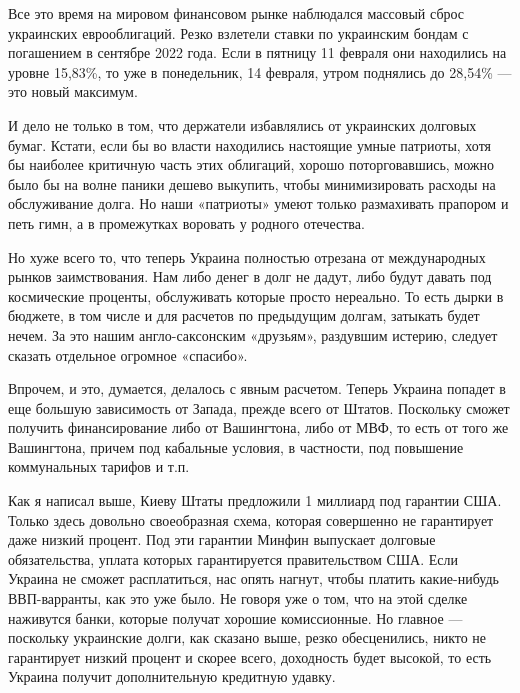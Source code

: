 Все это время на мировом финансовом рынке наблюдался массовый сброс украинских
еврооблигаций. Резко взлетели ставки по украинским бондам с погашением в
сентябре 2022 года. Если в пятницу 11 февраля они находились на уровне 15,83\%,
то уже в понедельник, 14 февраля, утром поднялись до 28,54\% — это новый
максимум.

И дело не только в том, что держатели избавлялись от украинских долговых бумаг.
Кстати, если бы во власти находились настоящие умные патриоты, хотя бы наиболее
критичную часть этих облигаций, хорошо поторговавшись, можно было бы на волне
паники дешево выкупить, чтобы минимизировать расходы на обслуживание долга. Но
наши «патриоты» умеют только размахивать прапором и петь гимн, а в промежутках
воровать у родного отечества.

Но хуже всего то, что теперь Украина полностью отрезана от международных рынков
заимствования. Нам либо денег в долг не дадут, либо будут давать под
космические проценты, обслуживать которые просто нереально. То есть дырки в
бюджете, в том числе и для расчетов по предыдущим долгам, затыкать будет нечем.
За это нашим англо-саксонским «друзьям», раздувшим истерию, следует сказать
отдельное огромное «спасибо».

Впрочем, и это, думается, делалось с явным расчетом. Теперь Украина попадет в
еще большую зависимость от Запада, прежде всего от Штатов. Поскольку сможет
получить финансирование либо от Вашингтона, либо от МВФ, то есть от того же
Вашингтона, причем под кабальные условия, в частности, под повышение
коммунальных тарифов и т.п.

Как я написал выше, Киеву Штаты предложили 1 миллиард под гарантии США. Только
здесь довольно своеобразная схема, которая совершенно не гарантирует даже
низкий процент. Под эти гарантии Минфин выпускает долговые обязательства,
уплата которых гарантируется правительством США. Если Украина не сможет
расплатиться, нас опять нагнут, чтобы платить какие-нибудь ВВП-варранты, как
это уже было. Не говоря уже о том, что на этой сделке наживутся банки, которые
получат хорошие комиссионные. Но главное — поскольку украинские долги, как
сказано выше, резко обесценились, никто не гарантирует низкий процент и скорее
всего, доходность будет высокой, то есть Украина получит дополнительную
кредитную удавку.

